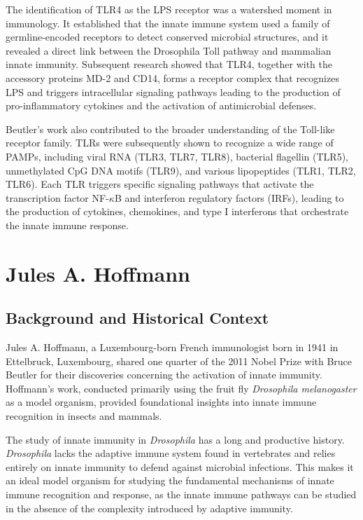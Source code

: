 The identification of TLR4 as the LPS receptor was a watershed moment in immunology. It established that the innate immune system used a family of germline-encoded receptors to detect conserved microbial structures, and it revealed a direct link between the Drosophila Toll pathway and mammalian innate immunity. Subsequent research showed that TLR4, together with the accessory proteins MD-2 and CD14, forms a receptor complex that recognizes LPS and triggers intracellular signaling pathways leading to the production of pro-inflammatory cytokines and the activation of antimicrobial defenses.

Beutler's work also contributed to the broader understanding of the Toll-like receptor family. TLRs were subsequently shown to recognize a wide range of PAMPs, including viral RNA (TLR3, TLR7, TLR8), bacterial flagellin (TLR5), unmethylated CpG DNA motifs (TLR9), and various lipopeptides (TLR1, TLR2, TLR6). Each TLR triggers specific signaling pathways that activate the transcription factor NF-$\kappa$B and interferon regulatory factors (IRFs), leading to the production of cytokines, chemokines, and type I interferons that orchestrate the innate immune response.

\section{Jules A. Hoffmann}

\subsection{Background and Historical Context}

Jules A. Hoffmann, a Luxembourg-born French immunologist born in 1941 in Ettelbruck, Luxembourg, shared one quarter of the 2011 Nobel Prize with Bruce Beutler for their discoveries concerning the activation of innate immunity. Hoffmann's work, conducted primarily using the fruit fly \textit{Drosophila melanogaster} as a model organism, provided foundational insights into innate immune recognition in insects and mammals.

The study of innate immunity in \textit{Drosophila} has a long and productive history. \textit{Drosophila} lacks the adaptive immune system found in vertebrates and relies entirely on innate immunity to defend against microbial infections. This makes it an ideal model organism for studying the fundamental mechanisms of innate immune recognition and response, as the innate immune pathways can be studied in the absence of the complexity introduced by adaptive immunity.

